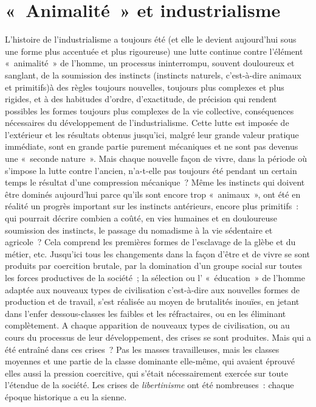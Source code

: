 \documentclass[french,twoside]{book} %
\begin{document}
\section[{« Animalité » et industrialisme}]{« Animalité » et industrialisme}
\noindent L'histoire de l’industrialisme a toujours été (et elle le devient aujourd’hui sous une forme plus accentuée et plus rigoureuse) une lutte continue contre l’élément « animalité » de l’homme, un processus ininterrompu, souvent douloureux et sanglant, de la soumission des instincts (instincts naturels, c’est-à-dire animaux et primitifs)à des règles toujours nouvelles, toujours plus complexes et plus rigides, et à des habitudes d’ordre, d’exactitude, de précision qui rendent possibles les formes toujours plus complexes de la vie collective, conséquences nécessaires du développement de l’industrialisme. Cette lutte est imposée de l’extérieur et les résultats obtenus jusqu’ici, malgré leur grande valeur pratique immédiate, sont en grande partie purement mécaniques et ne sont pas devenus une « seconde nature ». Mais chaque nouvelle façon de vivre, dans la période où s’impose la lutte contre l’ancien, n’a-t-elle pas toujours été pendant un certain temps le résultat d’une compression mécanique ? Même les instincts qui doivent être dominés aujourd’hui parce qu’ils sont encore trop « animaux », ont été en réalité un progrès important sur les instincts antérieurs, encore plus primitifs : qui pourrait décrire combien a coûté, en vies humaines et en douloureuse soumission des instincts, le passage du nomadisme à la vie sédentaire et agricole ? Cela comprend les premières formes de l’esclavage de la glèbe et du métier, etc. Jusqu’ici tous les changements dans la façon d’être et de vivre se sont produits par coercition brutale, par la domination d’un groupe social sur toutes les forces productives de la société ; la sélection ou l’ « éducation » de l’homme adaptée aux nouveaux types de civilisation c’est-à-dire aux nouvelles formes de production et de travail, s’est réalisée au moyen de brutalités inouïes, en jetant dans l’enfer dessous-classes les faibles et les réfractaires, ou en les éliminant complètement. A chaque apparition de nouveaux types de civilisation, ou au cours du processus de leur développement, des crises se sont produites. Mais qui a été entraîné dans ces crises ? Pas les masses travailleuses, mais les classes moyennes et une partie de la classe dominante elle-même, qui avaient éprouvé elles aussi la pression coercitive, qui s’était nécessairement exercée sur toute l’étendue de la société. Les crises de \emph{libertinisme} ont été nombreuses : chaque époque historique a eu la sienne.\par
\end{document}
